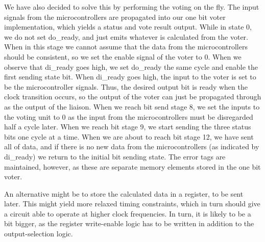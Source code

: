 \documentclass[11pt]{article}
\begin{document}
We have also decided to solve this by performing the voting on the
fly. The input signals from the microcontrollers are propagated into
our one bit voter implementation, which yields a status and vote
result output. While in state 0, we do not set do\_ready, and just
emits whatever is calculated from the voter. When in this stage we
cannot assume that the data from the microcontrollers should be
consistent, so we set the enable signal of the voter to 0. When we
observe that di\_ready goes high, we set do\_ready the same cycle and
enable the first sending state bit. When di\_ready goes high, the
input to the voter is set to be the microcontroller signals. Thus, the
desired output bit is ready when the clock transition occurs, so the
output of the voter can just be propagated through as the output of
the liaison. When we reach bit send stage 8, we set the inputs to the
voting unit to 0 as the input from the microcontrollers must be
disregarded half a cycle later. When we reach bit stage 9, we start
sending the three status bits one cycle at a time. When we are about
to reach bit stage 12, we have sent all of data, and if there is no
new data from the microcontrollers (as indicated by di\_ready) we
return to the initial bit sending state. The error tags are
maintained, however, as these are separate memory elements stored in
the one bit voter.

An alternative might be to store the calculated data in a register, to
be sent later. This might yield more relaxed timing constraints, which
in turn should give a circuit able to operate at higher clock
frequencies. In turn, it is likely to be a bit bigger, as the register
write-enable logic has to be written in addition to the
output-selection logic.
\end{document}
